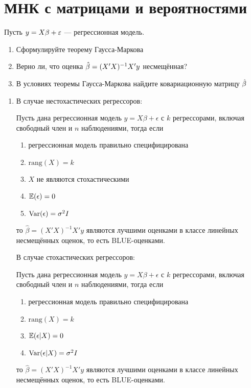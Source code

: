 \chapter{МНК с матрицами и вероятностями}


\begin{problem} 
Пусть $y = X\beta + \varepsilon$ --- регрессионная модель.
\begin{enumerate}
\item Сформулируйте теорему Гаусса-Маркова
\item Верно ли, что оценка $\hat{\beta} = (X'X)^{-1}X'y$ несмещённая?
\item В условиях теоремы Гаусса-Маркова найдите ковариационную матрицу $\hat{\beta}$
\end{enumerate}
\end{problem}

\begin{solution}
\begin{enumerate}
\item 
В случае нестохастических регрессоров:

Пусть дана регрессионная модель $y=X\beta+\epsilon$ с $k$ регрессорами, включая свободный член и $n$ наблюдениями, тогда если
\begin{enumerate}
\item регрессионная модель правильно специфицирована
\item $\text{rang}(X)=k$
\item $X$ не являются стохастическими
\item $\mathbb{E}(\epsilon)=0$
\item $\operatorname{Var}(\epsilon)=\sigma^2 I$
\end{enumerate}
то $\hat\beta=(X'X)^{-1}X'y$ являются лучшими оценками в классе линейных несмещённых оценок, то есть BLUE-оценками.

В случае стохастических регрессоров:

Пусть дана регрессионная модель $y=X\beta+\epsilon$ с $k$ регрессорами, включая свободный член и $n$ наблюдениями, тогда если
\begin{enumerate}
\item регрессионная модель правильно специфицирована
\item $\text{rang}(X)=k$
\item $\mathbb{E}(\epsilon|X)=0$
\item $\operatorname{Var}(\epsilon|X)=\sigma^2 I$
\end{enumerate}
то $\hat\beta=(X'X)^{-1}X'y$ являются лучшими оценками в классе линейных несмещённых оценок, то есть BLUE-оценками.


\end{enumerate}
\end{solution}
